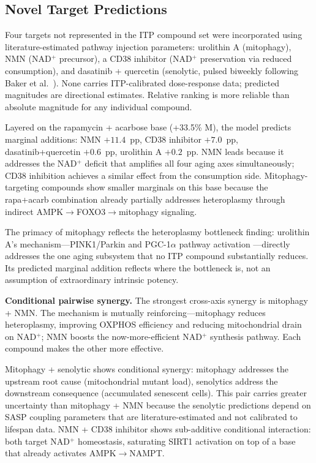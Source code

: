 \documentclass[11pt]{article}
\begin{document}
\subsection{Novel Target Predictions}

Four targets not represented in the ITP compound set were incorporated using literature-estimated pathway injection parameters: urolithin A (mitophagy), NMN (NAD$^+$ precursor), a CD38 inhibitor (NAD$^+$ preservation via reduced consumption), and dasatinib + quercetin (senolytic, pulsed biweekly following Baker et al.\ \citep{Baker2016}). None carries ITP-calibrated dose-response data; predicted magnitudes are directional estimates. Relative ranking is more reliable than absolute magnitude for any individual compound.

Layered on the rapamycin + acarbose base (+33.5\% M), the model predicts marginal additions: NMN $+11.4$~pp, CD38 inhibitor $+7.0$~pp, dasatinib+quercetin $+0.6$~pp, urolithin A $+0.2$~pp. NMN leads because it addresses the NAD$^+$ deficit that amplifies all four aging axes simultaneously; CD38 inhibition achieves a similar effect from the consumption side. Mitophagy-targeting compounds show smaller marginals on this base because the rapa+acarb combination already partially addresses heteroplasmy through indirect AMPK$\to$FOXO3$\to$mitophagy signaling.


The primacy of mitophagy reflects the heteroplasmy bottleneck finding: urolithin A's mechanism---PINK1/Parkin and PGC-1$\alpha$ pathway activation \citep{Luan2021}---directly addresses the one aging subsystem that no ITP compound substantially reduces. Its predicted marginal addition reflects where the bottleneck is, not an assumption of extraordinary intrinsic potency.

\textbf{Conditional pairwise synergy.} The strongest cross-axis synergy is mitophagy + NMN. The mechanism is mutually reinforcing---mitophagy reduces heteroplasmy, improving OXPHOS efficiency and reducing mitochondrial drain on NAD$^+$; NMN boosts the now-more-efficient NAD$^+$ synthesis pathway. Each compound makes the other more effective.

Mitophagy + senolytic shows conditional synergy: mitophagy addresses the upstream root cause (mitochondrial mutant load), senolytics address the downstream consequence (accumulated senescent cells). This pair carries greater uncertainty than mitophagy + NMN because the senolytic predictions depend on SASP coupling parameters that are literature-estimated and not calibrated to lifespan data. NMN + CD38 inhibitor shows sub-additive conditional interaction: both target NAD$^+$ homeostasis, saturating SIRT1 activation on top of a base that already activates AMPK$\to$NAMPT.
\end{document}
